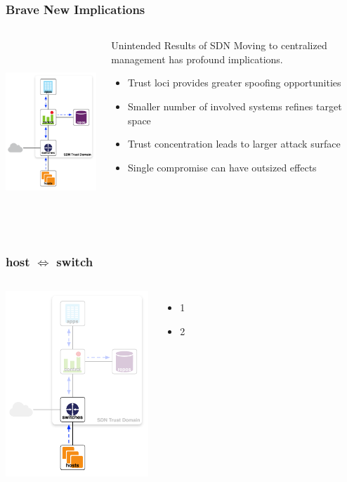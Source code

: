 \documentclass[t,handout]{beamer}
\begin{document}
\begin{frame}
\frametitle{Brave New Implications}
\begin{columns}[T]
\includegraphics[height=2.75in]{reference-model}
\begin{beamerboxesrounded}[shadow]{Unintended Results of SDN}
Moving to centralized management has profound implications.
\begin{itemize}
\item Trust loci provides greater spoofing opportunities
\item Smaller number of involved systems refines target space
\item Trust concentration leads to larger attack surface
\item Single compromise can have outsized effects
\end{itemize}
\end{beamerboxesrounded}
\end{columns}
\end{frame}

\begin{frame}
\frametitle{host $\Longleftrightarrow$ switch}
\begin{columns}[T]
\includegraphics[height=2.75in]{ra-h-sw}
\begin{itemize}
\item 1
\item 2
\end{itemize}
\end{columns}
\end{frame}
\end{document}
